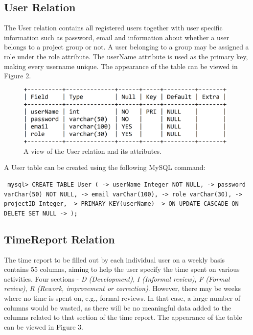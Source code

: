 \documentclass{article}
\begin{document}
\subsection{User Relation}
The User relation contains all registered users together with user specific information such as password, email and information about whether a user belongs to a project group or not. A user belonging to a group may be assigned a role under the role attribute. The userName attribute is used as the primary key, making every username unique. The appearance of the table can be viewed in Figure 2.

\begin{figure}[H]
     \centering
     \includegraphics[width=11cm]{images/SQL_tables/user.png}
     \renewcommand\figurename{Figure}
     \caption{A view of the User relation and its attributes.}
     \label{fig:my_label}
 \end{figure}

A User table can be created using the following MySQL command:
\newline

\small
\texttt{
\noindent mysql> CREATE TABLE User (\newline
\indent\indent\indent -> userName Integer NOT NULL,\newline
\indent\indent\indent -> password varChar(50) NOT NULL,\newline
\indent\indent\indent -> email varChar(100),\newline
\indent\indent\indent -> role varChar(30),\newline
\indent\indent\indent -> projectID Integer,\newline
\indent\indent\indent -> PRIMARY KEY(userName)\newline
\indent\indent\indent -> ON UPDATE CASCADE ON DELETE SET NULL\newline
\indent\indent\indent -> );\newline
}
\normalsize

\subsection{TimeReport Relation}
The time report to be filled out by each individual user on a weekly basis contains 55 columns, aiming to help the user specify the time spent on various activities. Four sections - \emph{D (Development)}, \emph{I (Informal review)}, \emph{F (Formal review)}, \emph{R (Rework, improvement or correction)}. However, there may be weeks where no time is spent on, e.g.,  formal reviews. In that case, a large number of columns would be wasted, as there will be no meaningful data added to the columns related to that section of the time report.  The appearance of the table can be viewed in Figure 3.
\end{document}
